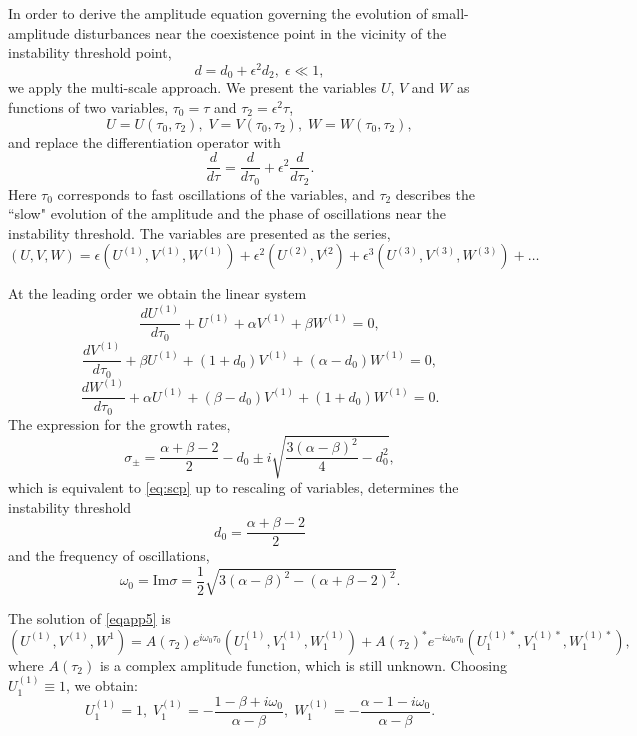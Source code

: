 \documentclass[3p,number,review,sort&compress]{elsarticle}
\begin{document}
In order to derive the amplitude equation governing the evolution of small-amplitude disturbances near the coexistence point in the vicinity of the instability threshold point, 
\begin{equation}
d=d_0+\epsilon^2d_2,\;\epsilon\ll 1,
\label{eqapp2}
\end{equation}
we apply the multi-scale approach. We present the variables $U$, $V$ and $W$ as functions of two variables, $\tau_0=\tau$ and $\tau_2=\epsilon^2\tau$,
$$U=U(\tau_0,\tau_2),\;V=V(\tau_0,\tau_2),\;W=W(\tau_0,\tau_2),$$
and replace the differentiation operator with
\begin{equation}
    \frac{d}{d\tau}=\frac{d}{d\tau_0}+\epsilon^2\frac{d}{d\tau_2}.
    \label{eqapp3}
\end{equation}
    Here $\tau_0$ corresponds to fast oscillations of the variables, and $\tau_2$ describes the ``slow" evolution of the amplitude and the phase of oscillations near the instability threshold.
    The variables are presented as the series,
\begin{equation}
    (U,V,W)=\epsilon(U^{(1)},V^{(1)},W^{(1)})+\epsilon^2(U^{(2)},V^{(2})+\epsilon^3(U^{(3)},V^{(3)},W^{(3)})+\ldots
    \label{eqapp4}
\end{equation}

At the leading order we obtain the linear system
$$\frac{dU^{(1)}}{d\tau_0}+U^{(1)}+\alpha V^{(1)}+\beta W^{(1)}=0,$$
\begin{equation}
    \frac{dV^{(1)}}{d\tau_0}+\beta U^{(1)}+(1+d_0)V^{(1)}+(\alpha-d_0)W^{(1)}=0,
    \label{eqapp5}
\end{equation}
$$\frac{dW^{(1)}}{d\tau_0}+\alpha U^{(1)}+(\beta-d_0)V^{(1)}+(1+d_0)W^{(1)}=0.$$
The expression for the growth rates,
$$\sigma_{\pm}=\frac{\alpha+\beta-2}{2}-d_0\pm i\sqrt{\frac{3(\alpha-\beta)^2}{4}-d_0^2},$$
which is equivalent to \eqref{eq:scp} up to rescaling of variables, determines the instability threshold
$$d_0=\frac{\alpha+\beta-2}{2}$$
and the frequency of oscillations,
$$\omega_0=\mbox{Im}\sigma=\frac{1}{2}\sqrt{3(\alpha-\beta)^2-(\alpha+\beta-2)^2}.$$

The solution of \eqref{eqapp5} is
$$(U^{(1)},V^{(1)},W^{1})=A(\tau_2)e^{i\omega_0\tau_0}(U_1^{(1)},V_1^{(1)},W_1^{(1)})+A(\tau_2)^*e^{-i\omega_0\tau_0}(U_1^{(1)*},V_1^{(1)*},W_1^{(1)*}),$$
where $A(\tau_2)$ is a complex amplitude function, which is still unknown. Choosing $U_1^{(1)}\equiv 1$, we obtain:
$$U_1^{(1)}=1,\;V_1^{(1)}=-\frac{1-\beta+i\omega_0}{\alpha-\beta},\;
W_1^{(1)}=-\frac{\alpha-1-i\omega_0}{\alpha-\beta}.$$
 
\end{document}
